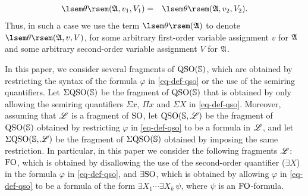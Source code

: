 \begin{eqnarray*}
\sem{\theta}(\A, v_1, V_1) & = & \sem{\theta}(\A, v_2, V_2).
\end{eqnarray*}
Thus, in such a case we use the term $\sem{\theta}(\A)$ to denote $\sem{\theta}(\A, v, V)$, for some arbitrary first-order variable assignment $v$ for $\mathfrak{A}$ and some arbitrary second-order variable assignment $V$ for $\mathfrak{A}$. 

In this paper, we consider several fragments of ${\rm QSO}(\mathbb{S})$, which are obtained by restricting the syntax of the formula $\varphi$ in \eqref{eq-def-qso} or the use of the semiring quantifiers. Let $\Sigma{\rm QSO}(\mathbb{S})$ be the fragment of ${\rm QSO}(\mathbb{S})$ that is obtained by only allowing the semiring quantifiers $\Sigma x$, $\Pi x$ and $\Sigma X$ in \eqref{eq-def-qso}. Moreover, assuming that $\mathscr{L}$ is a fragment of ${\rm SO}$, let ${\rm QSO}(\mathbb{S}, \mathscr{L})$ be the fragment of ${\rm QSO}(\mathbb{S})$ obtained by restricting $\varphi$ in \eqref{eq-def-qso} to be a formula in $\mathscr{L}$, and let $\Sigma{\rm QSO}(\mathbb{S}, \mathscr{L})$ be the fragment of $\Sigma{\rm QSO}(\mathbb{S})$ obtained by imposing the same restriction. In particular, in this paper we consider the following fragments $\mathscr{L}$: ${\rm FO}$, which is obtained by disallowing the use of the second-order quantifier ($\exists X$) in the formula $\varphi$ in \eqref{eq-def-qso}, and $\exists{\rm SO}$, which is obtained by allowing $\varphi$ in \eqref{eq-def-qso} to be a formula of the form $\exists X_1 \cdots \exists X_k \, \psi$, where $\psi$ is an ${\rm FO}$-formula. 




